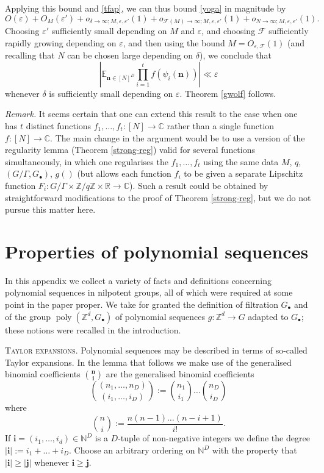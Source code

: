 \documentclass[11pt,reqno]{amsart}
\numberwithin{equation}{section}
\theoremstyle{plain}
\theoremstyle{definition}
\renewcommand{\geq}{\geqslant}
\newcommand\E{{\mathbb{E}}}
\newcommand\Z{\mathbb{Z}}
\newcommand\R{\mathbb{R}}
\newcommand\C{\mathbb{C}}
\newcommand\N{\mathbb{N}}
\newcommand\1{{\bf 1}}
\newcommand\2{{\bf 2}}
\newcommand\eps{\varepsilon}
\newcommand\poly{\operatorname{poly}}
\newcommand\Grow{{\mathcal F}}
\begin{document}
Applying this bound and \eqref{tfap}, we can thus bound \eqref{yoga} in magnitude by
$$ 
O(\eps) + O_M(\eps') + o_{\delta \to \infty; M,\eps,\eps'}(1) + o_{\Grow(M) \to \infty; M,\eps,\eps'}(1) + o_{N \to\infty;M,\eps,\eps'}(1).$$
Choosing $\eps'$ sufficiently small depending on $M$ and $\eps$, and choosing $\Grow$ sufficiently rapidly growing depending on $\eps$, and then using the bound $M = O_{\eps,\Grow}(1)$ (and recalling that $N$ can be chosen large depending on $\delta$), we conclude that
$$ | \E_{\mathbf{n} \in [N]^D} \prod_{i=1}^t f( \psi_i(\mathbf{n}) ) | \ll \eps$$
whenever $\delta$ is sufficiently small depending on $\eps$.  Theorem \ref{gwolf} follows.\vspace{11pt}

\emph{Remark.}  It seems certain that one can extend this result to the case when one has $t$ distinct functions $f_1,\ldots,f_t: [N] \to \C$ rather than a single function $f: [N] \to \C$.  The main change in the argument would be to use a version of the regularity lemma (Theorem \ref{strong-reg}) valid for several functions simultaneously, in which one regularises the $f_1,\ldots,f_t$ using the same data $M$, $q$, $(G/\Gamma,G_\bullet)$, $g()$ (but allows each function $f_i$ to be given a separate Lipschitz function $F_i: G/\Gamma \times \Z/q\Z \times \R \to \C$).  Such a result could be obtained by straightforward modifications to the proof of Theorem \ref{strong-reg}, but we do not pursue this matter here.

\appendix

\section{Properties of polynomial sequences}\label{appendix-a}

In this appendix we collect a variety of facts and definitions concerning polynomial sequences in nilpotent groups, all of which were required at some point in the paper proper. We take for granted the definition of filtration $G_{\bullet}$ and of the group $\poly(\Z^d, G_{\bullet})$ of polynomial sequences $g : \Z^d \rightarrow G$ adapted to $G_{\bullet}$; these notions were recalled in the introduction.\vspace{11pt}

\textsc{Taylor expansions.} Polynomial sequences may be described in terms of so-called Taylor expansions. In the lemma that follows we make use of the generalised binomial coefficients 
$\binom{\mathbf{n}}{\mathbf{i}}$ are the generalised binomial coefficients
$$ \binom{(n_1,\ldots,n_D)}{(i_1,\ldots,i_D)} := \binom{n_1}{i_1} \ldots \binom{n_D}{i_D}$$
where
$$ \binom{n}{i} := \frac{n(n-1)\ldots(n-i+1)}{i!}.$$ If $\mathbf{i} = (i_1,\dots,i_d) \in \N^D$ is a $D$-tuple of non-negative integers we define the degree $|\mathbf{i}|  := i_1+\ldots+i_D$. Choose an arbitrary ordering on $\N^D$ with the property that $|\mathbf{i}| \geq |\mathbf{j}|$ whenever $\mathbf{i} \geq \mathbf{j}$.
\end{document}
